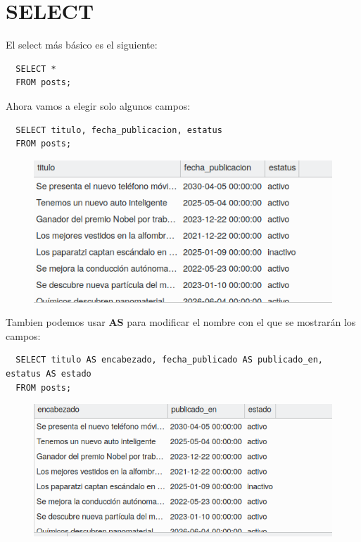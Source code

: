 \documentclass{article}
\begin{document}
\section{SELECT}%
El select más básico es el siguiente:
\begin{verbatim}
  SELECT *
  FROM posts;
\end{verbatim}

Ahora vamos a elegir solo algunos campos:
\begin{verbatim}
  SELECT titulo, fecha_publicacion, estatus
  FROM posts;
\end{verbatim}
\begin{figure}[h!]
  \centering
  \includegraphics[scale=0.55]{./Pictures/080_select.png}
\end{figure}

Tambien podemos usar \textbf{AS} para modificar el nombre con el que se mostrarán los campos:
\begin{verbatim}
  SELECT titulo AS encabezado, fecha_publicado AS publicado_en, estatus AS estado
  FROM posts;
\end{verbatim}
\begin{figure}[h!]
  \centering
  \includegraphics[scale=0.55]{./Pictures/081_select_as.png}
\end{figure}

\newpage
\end{document}
